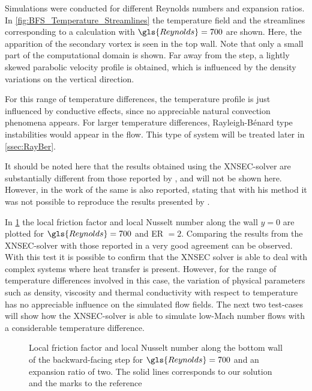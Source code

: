  Simulations were conducted for different Reynolds numbers and expansion ratios. In \cref{fig:BFS_Temperature_Streamlines} the temperature field and the streamlines corresponding to a calculation with $\gls{Reynolds} = 700$ are shown. Here, the apparition of the secondary vortex is seen in the top wall. Note that only a small part of the computational domain is shown. Far away from the step, a lightly skewed parabolic velocity profile is obtained, which is influenced by the density variations on the vertical direction.
 
 For this range of temperature differences, the temperature profile is just influenced by conductive effects, since no appreciable natural convection phenomena appears. For larger temperature differences, Rayleigh-Bénard type instabilities would appear in the flow. This type of system will be treated later in \cref{ssec:RayBer}.
 
It should be noted here that the results obtained using the XNSEC-solver are substantially different from those reported by \cite{xieFluidFlowHeat2016}, and will not be shown here. However, in the work of \cite{henninkLowMachNumberFlow2022} the same is also reported, stating that with his method it was not possible to reproduce the results presented by \cite{xieFluidFlowHeat2016}. 

In \cref{fig:fd_Nu_plot} the local friction factor and local Nusselt number along the wall $y = 0$ are plotted for $\gls{Reynolds} = 700$ and ER $= 2$. Comparing the results from the XNSEC-solver with those reported in \cite{henninkLowMachNumberFlow2022} a very good agreement can be observed.
With this test it is possible to confirm that the XNSEC solver is able to deal with complex systems where heat transfer is present. However, for the range of temperature differences involved in this case, the variation of physical parameters such as density, viscosity and thermal conductivity with respect to temperature has no appreciable influence on the simulated flow fields. The next two test-cases will show how the XNSEC-solver is able to simulate low-Mach number flows with a considerable temperature difference.
\begin{figure}[tb]
	\caption[Local friction factor and local Nusselt number along the bottom wall of the backward-facing step for $\gls{Reynolds} = 700$ and an expansion ratio of two.]{Local friction factor and local Nusselt number along the bottom wall of the backward-facing step for $\gls{Reynolds} = 700$ and an expansion ratio of two. The solid lines corresponds to our solution and the marks to the reference \citep{henninkLowMachNumberFlow2022}}
	\label{fig:fd_Nu_plot}
\end{figure}%
\FloatBarrier%